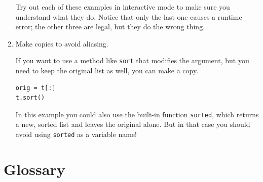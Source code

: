 \documentclass[10pt]{book}
\begin{document}
\begin{enumerate}
Try out each of these examples in interactive mode to make sure
you understand what they do.  Notice that only the last
one causes a runtime error; the other three are legal, but they
do the wrong thing.


\item Make copies to avoid aliasing.


If you want to use a method like {\tt sort} that modifies
the argument, but you need to keep the original list as
well, you can make a copy.

\beforeverb
\begin{verbatim}
orig = t[:]
t.sort()
\end{verbatim}
\afterverb

In this example you could also use the built-in function {\tt sorted},
which returns a new, sorted list and leaves the original alone.
But in that case you should avoid using {\tt sorted} as a variable
name!

\end{enumerate}



\section{Glossary}
\end{document}
